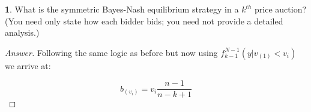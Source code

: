 \documentclass[12pt]{article}
\theoremstyle{definition}
\newtheorem{subproblem}{}[problem]
\begin{document}
\begin{subproblem}
What is the symmetric Bayes-Nash equilibrium strategy in a $k^{t h}$ price auction? (You need only state how each bidder bids; you need not provide a detailed analysis.)
\end{subproblem}
\begin{proof}[Answer]
Following the same logic as before but now using $f_{k-1}^{N-1}(y|v_{(1)}<v_i)$ we arrive at:

$$\boxed{b_(v_i) = v_i\frac{n-1}{n-k+1}}$$
\end{proof}
\end{document}
